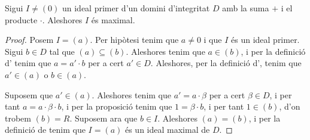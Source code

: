 \documentclass[../Apunts.tex]{subfiles}
\begin{document}
	\begin{proposition}
		\label{prop:ideal primer en DI es maximal}
		Sigui \(I\neq(0)\) un ideal primer d'un domini d'integritat \(D\) amb la suma \(+\) i el producte \(\cdot\). Aleshores \(I\) és maximal.
		\begin{proof}
			Posem \(I=(a)\). Per hipòtesi tenim que \(a\neq0\) i que \(I\) és un ideal primer. Sigui \(b\in D\) tal que \((a)\subseteq(b)\). Aleshores tenim que \(a\in(b)\), i per la definició d' tenim que \(a=a'\cdot b\) per a cert \(a'\in D\). Aleshores, per la definició d', tenim que \(a'\in(a)\) o \(b\in(a)\).
			
			Suposem que \(a'\in(a)\). Aleshores tenim que \(a'=a\cdot\beta\) per a cert \(\beta\in D\), i per tant \(a=a\cdot\beta\cdot b\), i per la proposició  tenim que \(1=\beta\cdot b\), i per tant \(1\in(b)\), d'on trobem \((b)=R\). Suposem ara que \(b\in I\). Aleshores \((a)=(b)\), i per la definició de  tenim que \(I=(a)\) és un ideal maximal de \(D\).
		\end{proof}
	\end{proposition}
\end{document}

